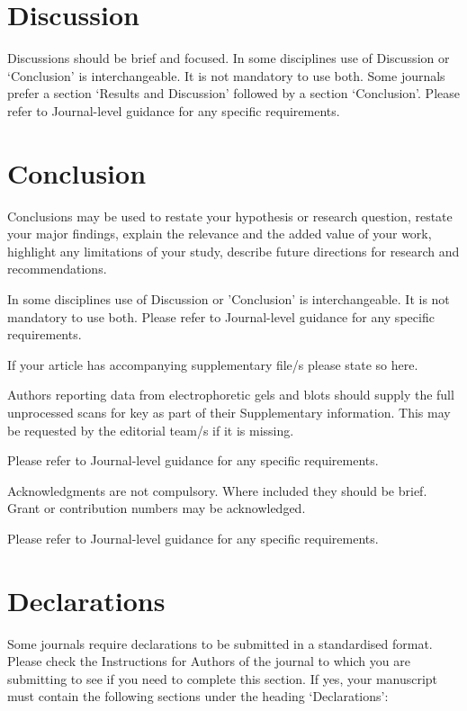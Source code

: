 \documentclass[
	a4paper, %
	10pt, %
	unnumberedsections, %
	twoside, %
]{LTJournalArticle}
\begin{document}
\section{Discussion}\label{sec12}

Discussions should be brief and focused. In some disciplines use of Discussion or `Conclusion' is interchangeable. It is not mandatory to use both. Some journals prefer a section `Results and Discussion' followed by a section `Conclusion'. Please refer to Journal-level guidance for any specific requirements. 

\section{Conclusion}\label{sec13}

Conclusions may be used to restate your hypothesis or research question, restate your major findings, explain the relevance and the added value of your work, highlight any limitations of your study, describe future directions for research and recommendations. 

In some disciplines use of Discussion or 'Conclusion' is interchangeable. It is not mandatory to use both. Please refer to Journal-level guidance for any specific requirements. 

\backmatter


If your article has accompanying supplementary file/s please state so here. 

Authors reporting data from electrophoretic gels and blots should supply the full unprocessed scans for key as part of their Supplementary information. This may be requested by the editorial team/s if it is missing.

Please refer to Journal-level guidance for any specific requirements.


Acknowledgments are not compulsory. Where included they should be brief. Grant or contribution numbers may be acknowledged.

Please refer to Journal-level guidance for any specific requirements.

\section*{Declarations}

Some journals require declarations to be submitted in a standardised format. Please check the Instructions for Authors of the journal to which you are submitting to see if you need to complete this section. If yes, your manuscript must contain the following sections under the heading `Declarations':
\end{document}

